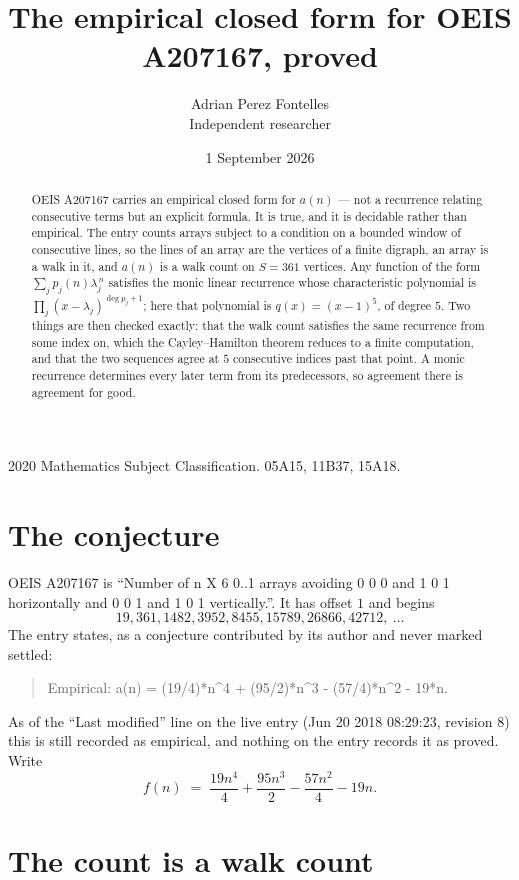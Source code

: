 \documentclass[11pt,a4paper]{article}
\title{The empirical closed form for OEIS A207167, proved}
\author{Adrian Perez Fontelles\\ \small Independent researcher}
\date{1 September 2026}
\theoremstyle{plain}
\theoremstyle{definition}
\begin{document}
\maketitle

\begin{abstract}
OEIS A207167 carries an empirical closed form for $a(n)$ --- not a recurrence relating
consecutive terms but an explicit formula. It is true, and it is decidable rather than
empirical. The entry counts arrays subject to a condition on a bounded window of consecutive lines, so the lines of an array are the
vertices of a finite digraph, an array is a walk in it, and $a(n)$ is a walk count on
$S=361$ vertices. Any function of the form $\sum_j p_j(n)\lambda_j^{\,n}$ satisfies the
monic linear recurrence whose characteristic polynomial is
$\prod_j(x-\lambda_j)^{\deg p_j+1}$; here that polynomial is $q(x)=(x-1)^{5}$, of degree
$5$. Two things are then checked exactly: that the walk count satisfies the same
recurrence from some index on, which the Cayley--Hamilton theorem reduces to a finite
computation, and that the two sequences agree at $5$ consecutive indices past that
point. A monic recurrence determines every later term from its predecessors, so agreement
there is agreement for good.
\end{abstract}

\noindent\small 2020 Mathematics Subject Classification. 05A15, 11B37, 15A18.\normalsize

\section{The conjecture}

OEIS A207167 is ``Number of n X 6 0..1 arrays avoiding 0 0 0 and 1 0 1 horizontally and 0 0 1 and 1 0 1 vertically.''. It has offset $1$ and begins
\[
19, 361, 1482, 3952, 8455, 15789, 26866, 42712,\ \dots
\]
The entry states, as a conjecture contributed by its author and never marked settled:
\begin{quote}
Empirical: a(n) = (19/4)*n\^{}4 + (95/2)*n\^{}3 - (57/4)*n\^{}2 - 19*n.
\end{quote}
As of the ``Last modified'' line on the live entry (Jun 20 2018 08:29:23, revision 8) this is still
recorded as empirical, and nothing on the entry records it as proved. Write
\[
f(n)\;=\;\frac{19 n^{4}}{4} + \frac{95 n^{3}}{2} - \frac{57 n^{2}}{4} - 19 n.
\]

\section{The count is a walk count}
\end{document}
